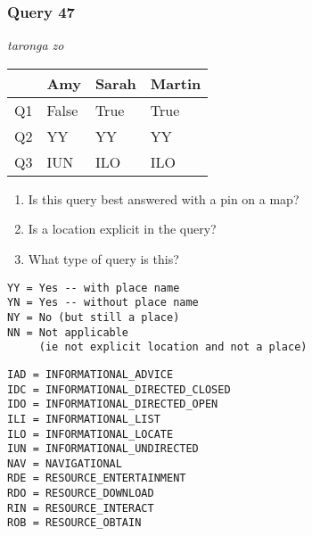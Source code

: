 \begin{frame}[fragile]
\frametitle{Query 47}
\vspace{1em}

\emph{taronga zo}

\vfill

\begin{table}
  \centering
  \begin{tabular}{ l l l l }
    & \textbf{Amy} & \textbf{Sarah} & \textbf{Martin}\\
    \toprule
    Q1 & False & True & True\\
Q2 & YY & YY & YY\\
Q3 & IUN & ILO & ILO\\
    \bottomrule
  \end{tabular}
\end{table}

\vfill

\tiny{

\begin{enumerate}
\item Is this query best answered with a pin on a map?
\item Is a location explicit in the query?
\item What type of query is this?
\end{enumerate}

\vfill

\begin{multicols}{2}
\begin{verbatim}
YY = Yes -- with place name
YN = Yes -- without place name
NY = No (but still a place)
NN = Not applicable 
     (ie not explicit location and not a place)
\end{verbatim}

\columnbreak
\begin{verbatim}
IAD = INFORMATIONAL_ADVICE
IDC = INFORMATIONAL_DIRECTED_CLOSED
IDO = INFORMATIONAL_DIRECTED_OPEN
ILI = INFORMATIONAL_LIST
ILO = INFORMATIONAL_LOCATE
IUN = INFORMATIONAL_UNDIRECTED
NAV = NAVIGATIONAL
RDE = RESOURCE_ENTERTAINMENT
RDO = RESOURCE_DOWNLOAD
RIN = RESOURCE_INTERACT
ROB = RESOURCE_OBTAIN
\end{verbatim}
\end{multicols}
}

\end{frame}


